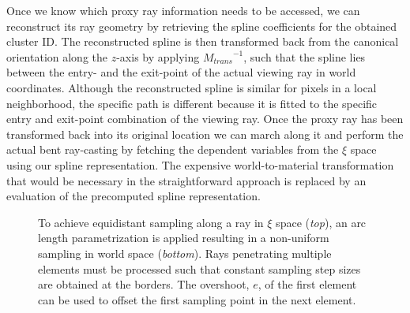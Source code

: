 \documentclass[journal]{vgtc}                %
\begin{document}
Once we know which proxy ray information needs to be accessed, we can reconstruct its ray geometry by retrieving the spline coefficients for the obtained cluster ID. The reconstructed spline is then transformed back from the canonical orientation along the $z$-axis by applying ${M_{trans}}^{-1}$, such that the spline lies between the entry- and the exit-point of the actual viewing ray in world coordinates. Although the reconstructed spline is similar for pixels in a local neighborhood, the specific path is different because it is fitted to the specific entry and exit-point combination of the viewing ray. Once the proxy ray has been transformed back into its original location we can march along it and perform the actual bent ray-casting by fetching the dependent variables from the $\xi$ space using our spline representation. The expensive world-to-material transformation that would be necessary in the straightforward approach is replaced by an evaluation of the precomputed spline representation. 
%
\begin{figure}[b]
    \centering
    \caption{ To achieve equidistant sampling along a ray in $\xi$ space ({\it top}), an arc length parametrization is applied resulting in a non-uniform sampling in world space ({\it bottom}).  Rays penetrating multiple elements must be processed such that constant sampling step sizes are obtained at the borders. The overshoot, $e$, of the first element can be used to offset the first sampling point in the next element.}
    \label{fig:arclengthandovershoot}
\end{figure}
\end{document}

